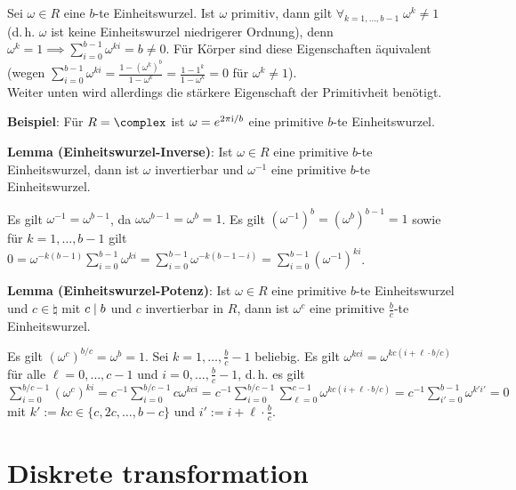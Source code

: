 Sei $\omega \in R$ eine $b$-te Einheitswurzel.
Ist $\omega$ primitiv, dann gilt
$\forall_{k=1,\dotsc,b-1}\; \omega^k \not= 1$
(d.\,h. $\omega$ ist keine Einheitswurzel niedrigerer Ordnung),
denn $\omega^k = 1 \implies \sum_{i=0}^{b-1} \omega^{ki} = b \not= 0$.
Für Körper sind diese Eigenschaften äquivalent
(wegen $\sum_{i=0}^{b-1} \omega^{ki} = \frac{1 - (\omega^k)^b}{1 - \omega^k}
= \frac{1 - 1^k}{1 - \omega^k} = 0$ für $\omega^k \not= 1$).\\
Weiter unten wird allerdings die stärkere Eigenschaft der Primitivheit benötigt.

\textbf{Beispiel}:
Für $R = \complex$ ist $\omega = e^{2\pi\mathrm{i}/b}$ eine primitive $b$-te Einheitswurzel.

\textbf{Lemma (Einheitswurzel-Inverse)}:
Ist $\omega \in R$ eine primitive $b$-te Einheitswurzel,
dann ist $\omega$ invertierbar und $\omega^{-1}$ eine primitive $b$-te Einheitswurzel.

\begin{Beweis}
    Es gilt $\omega^{-1} = \omega^{b-1}$, da
    $\omega \omega^{b-1} = \omega^b = 1$.
    Es gilt $(\omega^{-1})^b = (\omega^b)^{b-1} = 1$ sowie für $k = 1, \dotsc, b-1$ gilt
    $0 = \omega^{-k(b-1)} \sum_{i=0}^{b-1} \omega^{ki}
    = \sum_{i=0}^{b-1} \omega^{-k(b-1-i)}
    = \sum_{i=0}^{b-1} (\omega^{-1})^{ki}$.
\end{Beweis}

\textbf{Lemma (Einheitswurzel-Potenz)}:
Ist $\omega \in R$ eine primitive $b$-te Einheitswurzel und $c \in \natural$ mit $c \mid b$
und $c$ invertierbar in $R$,
dann ist $\omega^c$ eine primitive $\frac{b}{c}$-te Einheitswurzel.

\begin{Beweis}
    Es gilt $(\omega^c)^{b/c} = \omega^b = 1$.
    Sei $k = 1, \dotsc, \frac{b}{c}-1$ beliebig.
    Es gilt $\omega^{kci} = \omega^{kc(i+\ell\cdot b/c)}$ für alle $\ell = 0, \dotsc, c-1$
    und $i = 0, \dotsc, \frac{b}{c} - 1$,
    d.\,h. es gilt\\
    $\sum_{i=0}^{b/c-1} (\omega^c)^{ki}
    = c^{-1} \sum_{i=0}^{b/c-1} c \omega^{kci}
    = c^{-1} \sum_{i=0}^{b/c-1} \sum_{\ell=0}^{c-1} \omega^{kc(i+\ell\cdot b/c)}
    = c^{-1} \sum_{i'=0}^{b-1} \omega^{k'i'} = 0$\\
    mit $k' := kc \in \{c, 2c, \dotsc, b - c\}$ und
    $i' := i + \ell \cdot \frac{b}{c}$.
\end{Beweis}

\pagebreak

\section{%
    Diskrete transformation%
}

